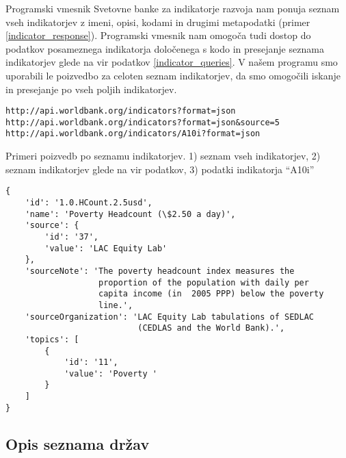 Programski vmesnik Svetovne banke za indikatorje razvoja nam ponuja seznam 
vseh indikatorjev z imeni, opisi, kodami in drugimi metapodatki 
(primer \ref{indicator_response}). Programski vmesnik nam omogoča tudi dostop
do podatkov posameznega indikatorja določenega s kodo in presejanje seznama 
indikatorjev glede na vir podatkov \ref{indicator_queries}. V našem programu
smo uporabili le poizvedbo za celoten seznam indikatorjev, da smo omogočili 
iskanje in presejanje po vseh poljih indikatorjev.


\begin{snippet}
\begin{center}
\begin{lstlisting}
http://api.worldbank.org/indicators?format=json
http://api.worldbank.org/indicators?format=json&source=5
http://api.worldbank.org/indicators/A10i?format=json
\end{lstlisting}
\end{center}
\caption{Primeri poizvedb po seznamu indikatorjev.
1) seznam vseh indikatorjev, 2) seznam indikatorjev glede na vir podatkov,
3) podatki indikatorja ``A10i''}
\label{indicator_queries}
\end{snippet} 


\begin{snippet}
\begin{center}
\begin{lstlisting}
{
    'id': '1.0.HCount.2.5usd',
    'name': 'Poverty Headcount (\$2.50 a day)',
    'source': {
        'id': '37',
        'value': 'LAC Equity Lab'
    },
    'sourceNote': 'The poverty headcount index measures the 
                   proportion of the population with daily per 
                   capita income (in  2005 PPP) below the poverty
                   line.',
    'sourceOrganization': 'LAC Equity Lab tabulations of SEDLAC 
                           (CEDLAS and the World Bank).',
    'topics': [
        {
            'id': '11',
            'value': 'Poverty '
        }
    ]
}
\end{lstlisting}
\end{center}
\caption{Podatki indikatorja 
stopnja revščine pri dohodku 2,5 dolarja na dan.}
\label{indicator_response}
\end{snippet} 


\subsection{Opis seznama držav}

